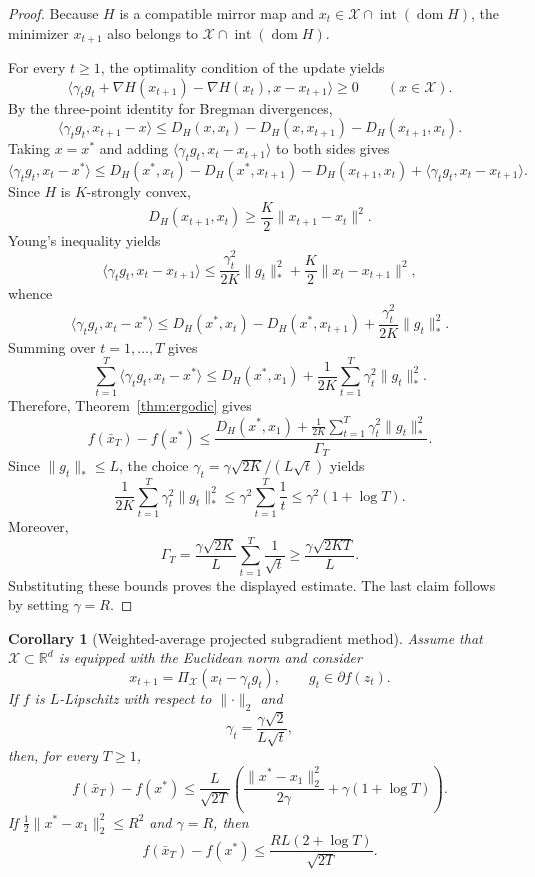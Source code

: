 \documentclass[11pt]{article}
\newtheorem{corollary}[theorem]{Corollary}
\theoremstyle{definition}
\theoremstyle{remark}
\newcommand{\R}{\mathbb{R}}
\newcommand{\X}{\mathcal{X}}
\newcommand{\inner}[2]{\langle #1, #2 \rangle}
\newcommand{\norm}[1]{\lVert #1 \rVert}
\newcommand{\normdual}[1]{\lVert #1 \rVert_*}
\DeclareMathOperator{\dom}{dom}
\begin{document}
\begin{proof}
Because $H$ is a compatible mirror map and $x_t \in \X \cap \operatorname{int}(\dom H)$, the minimizer $x_{t+1}$ also belongs to $\X \cap \operatorname{int}(\dom H)$.

For every $t\ge 1$, the optimality condition of the update yields
\[
    \inner{\gamma_t g_t + \nabla H(x_{t+1})-\nabla H(x_t)}{x-x_{t+1}} \ge 0
    \qquad
    (x \in \X).
\]
By the three-point identity for Bregman divergences,
\[
    \inner{\gamma_t g_t}{x_{t+1}-x}
    \le
    D_H(x,x_t)-D_H(x,x_{t+1})-D_H(x_{t+1},x_t).
\]
Taking $x=x^*$ and adding $\inner{\gamma_t g_t}{x_t-x_{t+1}}$ to both sides gives
\[
    \inner{\gamma_t g_t}{x_t-x^*}
    \le
    D_H(x^*,x_t)-D_H(x^*,x_{t+1})-D_H(x_{t+1},x_t)
    +
    \inner{\gamma_t g_t}{x_t-x_{t+1}}.
\]
Since $H$ is $K$-strongly convex,
\[
    D_H(x_{t+1},x_t) \ge \frac{K}{2}\norm{x_{t+1}-x_t}^2.
\]
Young's inequality yields
\[
    \inner{\gamma_t g_t}{x_t-x_{t+1}}
    \le
    \frac{\gamma_t^2}{2K}\normdual{g_t}^2
    +
    \frac{K}{2}\norm{x_t-x_{t+1}}^2,
\]
whence
\[
    \inner{\gamma_t g_t}{x_t-x^*}
    \le
    D_H(x^*,x_t)-D_H(x^*,x_{t+1})
    +
    \frac{\gamma_t^2}{2K}\normdual{g_t}^2.
\]
Summing over $t=1,\dots,T$ gives
\[
    \sum_{t=1}^T \inner{\gamma_t g_t}{x_t-x^*}
    \le
    D_H(x^*,x_1)
    +
    \frac{1}{2K}\sum_{t=1}^T \gamma_t^2\normdual{g_t}^2.
\]
Therefore, Theorem~\ref{thm:ergodic} gives
\[
    f(\bar{x}_T)-f(x^*)
    \le
    \frac{D_H(x^*,x_1) + \frac{1}{2K}\sum_{t=1}^T \gamma_t^2\normdual{g_t}^2}{\Gamma_T}.
\]
Since $\normdual{g_t}\le L$, the choice $\gamma_t = \gamma\sqrt{2K}/(L\sqrt{t})$ yields
\[
    \frac{1}{2K}\sum_{t=1}^T \gamma_t^2\normdual{g_t}^2
    \le
    \gamma^2\sum_{t=1}^T \frac{1}{t}
    \le
    \gamma^2(1+\log T).
\]
Moreover,
\[
    \Gamma_T
    =
    \frac{\gamma\sqrt{2K}}{L}\sum_{t=1}^T \frac{1}{\sqrt{t}}
    \ge
    \frac{\gamma\sqrt{2KT}}{L}.
\]
Substituting these bounds proves the displayed estimate. The last claim follows by setting $\gamma=R$.
\end{proof}

\begin{corollary}[Weighted-average projected subgradient method]
\label{cor:euclidean-md}
Assume that $\X \subset \R^d$ is equipped with the Euclidean norm and consider
\[
    x_{t+1} = \Pi_{\X}(x_t-\gamma_t g_t),
    \qquad
    g_t \in \partial f(z_t).
\]
If $f$ is $L$-Lipschitz with respect to $\norm{\cdot}_2$ and
\[
    \gamma_t = \frac{\gamma\sqrt{2}}{L\sqrt{t}},
\]
then, for every $T\ge 1$,
\[
    f(\bar{x}_T)-f(x^*)
    \le
    \frac{L}{\sqrt{2T}}
    \left(
        \frac{\norm{x^*-x_1}_2^2}{2\gamma}
        +
        \gamma(1+\log T)
    \right).
\]
If $\frac12 \norm{x^*-x_1}_2^2 \le R^2$ and $\gamma=R$, then
\[
    f(\bar{x}_T)-f(x^*)
    \le
    \frac{RL(2+\log T)}{\sqrt{2T}}.
\]
\end{corollary}
\end{document}
